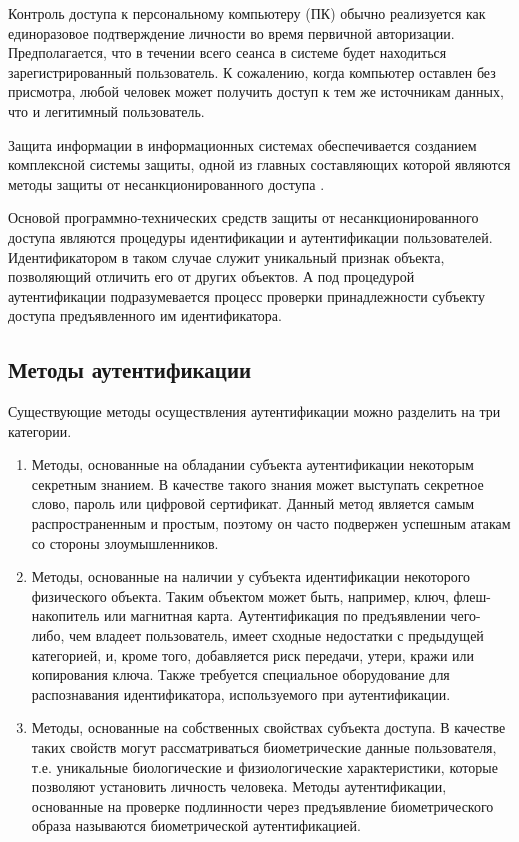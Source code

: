 \documentclass[12pt]{article}
\begin{document}
    \par Контроль доступа к персональному компьютеру (ПК) обычно реализуется как единоразовое подтверждение личности во время первичной авторизации. Предполагается, что в течении всего сеанса в системе будет находиться зарегистрированный пользователь. К сожалению, когда компьютер оставлен без присмотра, любой человек может получить доступ к тем же источникам данных, что и легитимный пользователь.

    \par Защита информации в информационных системах обеспечивается созданием комплексной системы защиты, одной из главных составляющих которой являются методы защиты от несанкционированного доступа \cite{BiometricRecognition, BiometricSystem}.

    \par Основой программно-технических средств защиты от несанкционированного доступа являются процедуры идентификации и аутентификации пользователей. Идентификатором в таком случае служит уникальный признак объекта, позволяющий отличить его от других объектов. А под процедурой аутентификации подразумевается процесс проверки принадлежности субъекту доступа предъявленного им идентификатора.


    \subsection{Методы аутентификации}
    \label{sec:Intro:ApplicationArea:AuthenticationMethods}

    \par Существующие методы осуществления аутентификации можно разделить на три категории.

    \begin{enumerate}
        \item Методы, основанные на обладании субъекта аутентификации некоторым секретным знанием. В качестве такого знания может выступать секретное слово, пароль или цифровой сертификат. Данный метод является самым распространенным и простым, поэтому он часто подвержен успешным атакам со стороны злоумышленников.

        \item Методы, основанные на наличии у субъекта идентификации некоторого физического объекта. Таким объектом может быть, например, ключ, флеш-накопитель или магнитная карта. Аутентификация по предъявлении чего-либо, чем владеет пользователь, имеет сходные недостатки с предыдущей категорией, и, кроме того, добавляется риск передачи, утери, кражи или копирования ключа. Также требуется специальное оборудование для распознавания идентификатора, используемого при аутентификации.

        \item Методы, основанные на собственных свойствах субъекта доступа. В качестве таких свойств могут рассматриваться биометрические данные пользователя, т.е. уникальные биологические и физиологические характеристики, которые позволяют установить личность человека. Методы аутентификации, основанные на проверке подлинности через предъявление биометрического образа называются биометрической аутентификацией.
    \end{enumerate}
\end{document}
